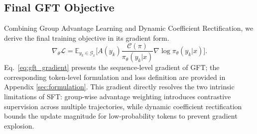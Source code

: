 





\subsection{Final GFT Objective}
Combining Group Advantage Learning and Dynamic Coefficient Rectification, we derive the final training objective in its gradient form.
{\small
\begin{equation}\label{eq:gft_gradient}
\nabla_{\theta}\mathcal{L}
=
\mathbb{E}_{y_k {\in} \mathcal{G}_x}
\Big[
A(y_k)
\frac{\mathcal{C}(\pi)}{\pi_{\theta}(y_k|x)}
\nabla\!\log \pi_{\theta}(y_k|x)
\Big].
\end{equation}
}
Eq.~\eqref{eq:gft_gradient} presents the sequence-level gradient of GFT; the corresponding token-level formulation and loss definition are provided in Appendix \ref{sec:formulation}.
This gradient directly resolves the two intrinsic limitations of SFT: group-wise advantage weighting introduces contrastive supervision across multiple trajectories, while dynamic coefficient rectification bounds the update magnitude for low-probability tokens to prevent gradient explosion.



